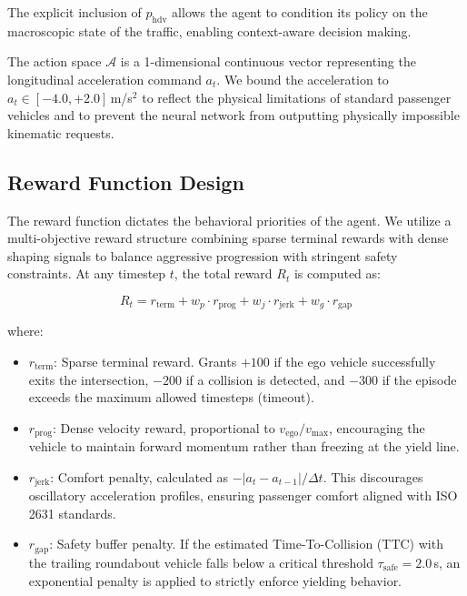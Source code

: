 \documentclass[conference]{IEEEtran}
\begin{document}
The explicit inclusion of $p_{\text{hdv}}$ allows the agent to condition its policy on the macroscopic state of the traffic, enabling context-aware decision making.

The action space $\mathcal{A}$ is a 1-dimensional continuous vector representing the longitudinal acceleration command $a_t$. We bound the acceleration to $a_t \in [-4.0, +2.0]$\,m/s$^2$ to reflect the physical limitations of standard passenger vehicles and to prevent the neural network from outputting physically impossible kinematic requests.

\subsection{Reward Function Design}
The reward function dictates the behavioral priorities of the agent. We utilize a multi-objective reward structure combining sparse terminal rewards with dense shaping signals to balance aggressive progression with stringent safety constraints. At any timestep $t$, the total reward $R_t$ is computed as:

\begin{equation}
R_t = r_{\text{term}} + w_p \cdot r_{\text{prog}} + w_j \cdot r_{\text{jerk}} + w_g \cdot r_{\text{gap}}
\end{equation}

where:
\begin{itemize}
    \item $r_{\text{term}}$: Sparse terminal reward. Grants $+100$ if the ego vehicle successfully exits the intersection, $-200$ if a collision is detected, and $-300$ if the episode exceeds the maximum allowed timesteps (timeout).
    \item $r_{\text{prog}}$: Dense velocity reward, proportional to $v_{\text{ego}} / v_{\text{max}}$, encouraging the vehicle to maintain forward momentum rather than freezing at the yield line.
    \item $r_{\text{jerk}}$: Comfort penalty, calculated as $- |a_t - a_{t-1}| / \Delta t$. This discourages oscillatory acceleration profiles, ensuring passenger comfort aligned with ISO 2631 standards.
    \item $r_{\text{gap}}$: Safety buffer penalty. If the estimated Time-To-Collision (TTC) with the trailing roundabout vehicle falls below a critical threshold $\tau_{\text{safe}} = 2.0$\,s, an exponential penalty is applied to strictly enforce yielding behavior.
\end{itemize}
\end{document}
